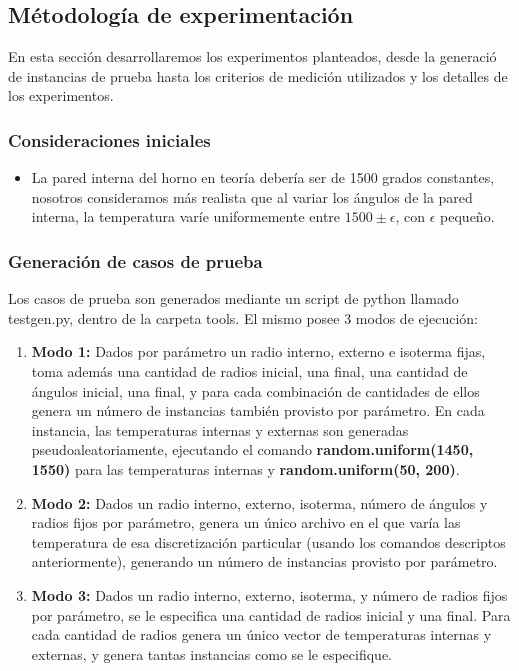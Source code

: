 \subsection{Métodología de experimentación}
En esta sección desarrollaremos los experimentos planteados, desde la generació de instancias de prueba hasta los criterios de medición utilizados y los detalles de los experimentos.
\subsubsection{Consideraciones iniciales}
\begin{itemize}
    \item La pared interna del horno en teoría debería ser de 1500 grados constantes, nosotros consideramos más realista que al variar los ángulos de la pared interna, la temperatura varíe uniformemente entre $1500 \pm \epsilon$, con $\epsilon$ pequeño.
\end{itemize}

\subsubsection{Generación de casos de prueba}
Los casos de prueba son generados mediante un script de python llamado testgen.py, dentro de la carpeta tools. El mismo posee 3 modos de ejecuci\'on: 
\begin{enumerate}
    \item \textbf{Modo 1:} Dados por par\'ametro un radio interno, externo e isoterma fijas, toma adem\'as  una cantidad de radios inicial, una final, una cantidad de \'angulos inicial, una final, y para cada combinaci\'on de cantidades de ellos genera un n\'umero de instancias tambi\'en provisto por par\'ametro. En cada instancia, las temperaturas internas y externas son generadas pseudoaleatoriamente, ejecutando el comando \textbf{random.uniform(1450, 1550)} para las temperaturas internas y \textbf{random.uniform(50, 200)}.
    \item \textbf{Modo 2:} Dados un radio interno, externo, isoterma, n\'umero de \'angulos y radios fijos por par\'ametro, genera un \'unico archivo en el que var\'ia las temperatura de esa discretizaci\'on particular (usando los comandos descriptos anteriormente), generando un n\'umero de instancias provisto por par\'ametro.
    \item \textbf{Modo 3:} Dados un radio interno, externo, isoterma, y n\'umero de radios fijos por par\'ametro, se le especifica una cantidad de radios inicial y una final.  Para cada cantidad de radios genera un \'unico vector de temperaturas internas y externas, y genera tantas instancias como se le especifique.

\end{enumerate}

